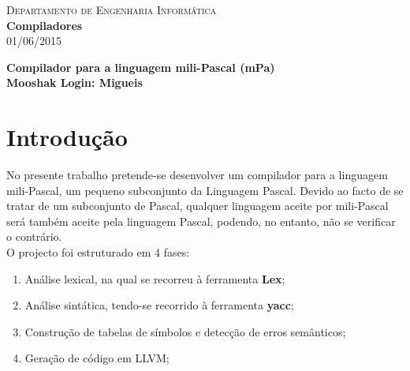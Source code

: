 \documentclass[12pt]{article}
\author{}
\date{}
\begin{document}
\begin{titlepage}
\begin{center}
\textsc{\LARGE Departamento de Engenharia Informática}\\[1.5cm]
\sepline
{ \huge \bfseries Compiladores}\\[0.4cm]
\textsc{\LARGE 01/06/2015}
\sepline

{\huge \bfseries Compilador para a linguagem mili-Pascal (mPa)}\\[0.4cm]

\textbf{Mooshak Login: Migueis}

\sepline
{}

\sepline

\end{center}
\end{titlepage}

\newpage

\pagestyle{fancy}
\fancyhf{}




\tableofcontents
\newpage


\section{Introdução}

\setlength{\parindent}{1cm} No presente trabalho pretende-se desenvolver um compilador para a linguagem mili-Pascal, um pequeno subconjunto da Linguagem Pascal. Devido ao facto de se tratar de um subconjunto de Pascal, qualquer linguagem aceite por mili-Pascal será também aceite pela linguagem Pascal, podendo, no entanto, não se verificar o contrário.\\
\indent O projecto foi estruturado em 4 fases:
\begin{enumerate}

\item Análise lexical, na qual se recorreu à ferramenta \textbf{Lex};
\item Análise sintática, tendo-se recorrido à ferramenta \textbf{yacc};
\item Construção de tabelas de símbolos e detecção de erros semânticos;
\item Geração de código em LLVM;

\end{enumerate}
\end{document}
